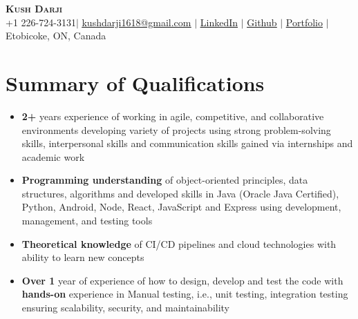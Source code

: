 \documentclass[letterpaper,11pt]{article}
\newcommand{\resumeItem}[1]{
  \item\small{
    {#1 \vspace{-2.5pt}}
  }
}
\newcommand{\resumeSubHeadingListStart}{\begin{itemize}[leftmargin=0.15in, label={}]}
\newcommand{\resumeSubHeadingListEnd}{\end{itemize}\vspace{-12pt}}
\newcommand{\resumeItemListStart}{\begin{itemize}}
\newcommand{\resumeItemListEnd}{\end{itemize}\vspace{-5pt}}
\begin{document}

\begin{center}
    \textbf{\Huge \scshape Kush Darji} \\ \vspace{1pt}
    \small +1 226-724-3131$|$ \href{mailto:kushdarji1618@gmail.com}{\underline{kushdarji1618@gmail.com}} $|$ 
    \href{https://www.linkedin.com/in/kush-darji-5037b316a/}{\underline{LinkedIn}} $|$
    \href{https://github.com/kushdarji11}{\underline{Github}} $|$
    \href{http://serverless-kush-app.s3-website.us-east-2.amazonaws.com/#/home}{\underline{Portfolio}} $|$
    \small Etobicoke, ON, Canada
\end{center}

\section{Summary of Qualifications}
  \resumeSubHeadingListStart
      \resumeItemListStart
        \resumeItem{{\bf 2+} years experience of working in agile, competitive, and collaborative environments developing variety of projects using strong problem-solving skills, interpersonal skills and communication skills gained via internships and academic work}
        
        \resumeItem{{\bf Programming understanding} of object-oriented principles, data structures, algorithms and developed skills in Java (Oracle Java Certified), Python, Android, Node, React, JavaScript and Express using development, management, and testing tools}
        
        \resumeItem{{\bf Theoretical knowledge} of CI/CD pipelines and cloud technologies with ability to learn new concepts}
    
        \resumeItem{{\bf Over 1} year of experience of how to design, develop and test the code with {\bf hands-on} experience in Manual testing, i.e., unit testing, integration testing ensuring scalability, security, and maintainability}\vspace{-3.5pt}
      \resumeItemListEnd
  \resumeSubHeadingListEnd
\end{document}
